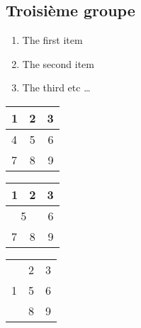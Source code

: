 \documentclass[12pt]{article}  %
\begin{document}
\subsection{Troisième groupe}


\begin{enumerate}
  \item The first item
  \item The second item
  \item The third etc \ldots
\end{enumerate}

\begin{tabular}{|  l  | c | r | }
  \hline                       
  1 & 2 & 3 \\ \hline
  4 & 5 & 6 \\ \hline
  7 & 8 & 9 \\
  \hline  
\end{tabular}

\begin{tabular}{|  l  | c | r | }
  \hline                       
  1 & 2 & 3 \\ \hline
  \multicolumn{2}{|c|}{ 5 } & 6 \\ \hline
  7 & 8 & 9 \\ 
  \hline  
\end{tabular}

\begin{tabular}{|  l  | c | r | }
  \hline      
  \multirow{3}{*}{1} & 2 & 3 \\ \cline{2-3}
   & 5 & 6 \\ \cline{2-3}
   & 8 & 9 \\
  \hline  
\end{tabular}
\end{document}

